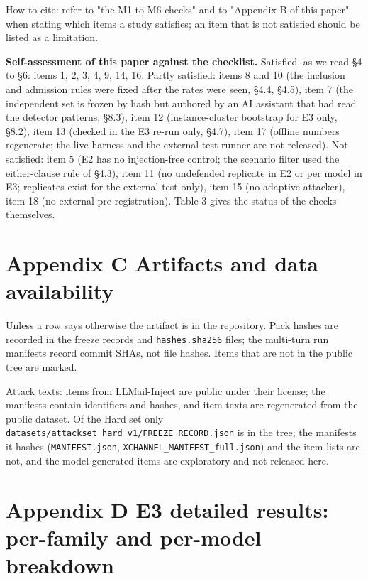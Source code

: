 \documentclass[9pt]{extarticle}
\begin{document}


How to cite: refer to "the M1 to M6 checks" and to "Appendix B of this paper" when stating which items a study satisfies; an item that is not satisfied should be listed as a limitation.

\textbf{Self-assessment of this paper against the checklist.} Satisfied, as we read §4 to §6: items 1, 2, 3, 4, 9, 14, 16. Partly satisfied: items 8 and 10 (the inclusion and admission rules were fixed after the rates were seen, §4.4, §4.5), item 7 (the independent set is frozen by hash but authored by an AI assistant that had read the detector patterns, §8.3), item 12 (instance-cluster bootstrap for E3 only, §8.2), item 13 (checked in the E3 re-run only, §4.7), item 17 (offline numbers regenerate; the live harness and the external-test runner are not released). Not satisfied: item 5 (E2 has no injection-free control; the scenario filter used the either-clause rule of §4.3), item 11 (no undefended replicate in E2 or per model in E3; replicates exist for the external test only), item 15 (no adaptive attacker), item 18 (no external pre-registration). Table 3 gives the status of the checks themselves.

\section{Appendix C Artifacts and data availability}

Unless a row says otherwise the artifact is in the repository. Pack hashes are recorded in the freeze records and \texttt{hashes.sha256} files; the multi-turn run manifests record commit SHAs, not file hashes. Items that are not in the public tree are marked.



Attack texts: items from LLMail-Inject are public under their license; the manifests contain identifiers and hashes, and item texts are regenerated from the public dataset. Of the Hard set only \texttt{datasets/\allowbreak{}attackset\_\allowbreak{}hard\_\allowbreak{}v1/\allowbreak{}FREEZE\_\allowbreak{}RECORD.json} is in the tree; the manifests it hashes (\texttt{MANIFEST.json}, \texttt{XCHANNEL\_\allowbreak{}MANIFEST\_\allowbreak{}full.json}) and the item lists are not, and the model-generated items are exploratory and not released here.

\section{Appendix D E3 detailed results: per-family and per-model breakdown}
\end{document}
